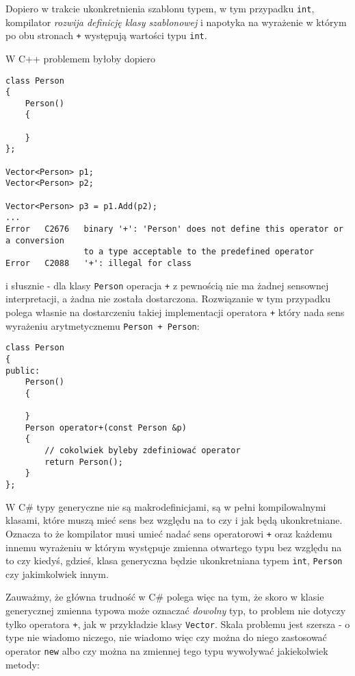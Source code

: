 Dopiero w trakcie ukonkretnienia szablonu typem, w tym przypadku {\tt int}, kompilator {\em rozwija definicję klasy szablonowej}
i napotyka na wyrażenie w którym po obu stronach {\tt +} występują wartości typu {\tt int}.

W C++ problemem byłoby dopiero

\begin{scriptsize}
\begin{verbatim}
class Person
{
    Person()
    {

    }
};

Vector<Person> p1;
Vector<Person> p2;

Vector<Person> p3 = p1.Add(p2);
...
Error	C2676	binary '+': 'Person' does not define this operator or a conversion 
                to a type acceptable to the predefined operator
Error	C2088	'+': illegal for class	
\end{verbatim}
\end{scriptsize}

i słusznie - dla klasy {\tt Person} operacja {\tt +} z pewnością nie ma żadnej sensownej interpretacji, a
żadna nie została dostarczona. Rozwiązanie w tym przypadku polega własnie na dostarczeniu takiej
implementacji operatora {\tt +} który nada sens wyrażeniu arytmetycznemu {\tt Person + Person}:

\begin{scriptsize}
\begin{verbatim}
class Person
{
public:
    Person()
    {

    }
    Person operator+(const Person &p) 
    {
        // cokolwiek byleby zdefiniować operator
        return Person();
    }
};
\end{verbatim}
\end{scriptsize}

W C\# typy generyczne nie są makrodefinicjami, są w pełni kompilowalnymi klasami, które muszą mieć sens 
bez względu na to czy i jak będą ukonkretniane. Oznacza to że kompilator musi umieć nadać sens operatorowi {\tt +}
oraz każdemu innemu wyrażeniu w którym występuje zmienna otwartego typu
bez względu na to czy kiedyś, gdzieś, klasa generyczna będzie ukonkretniana typem {\tt int}, {\tt Person} czy
jakimkolwiek innym.

Zauważmy, że główna trudność w C\# polega więc na tym, że skoro w klasie generycznej zmienna typowa może oznaczać
{\em dowolny} typ, to problem nie dotyczy tylko operatora {\tt +}, jak w przykładzie klasy {\tt Vector}. Skala problemu
jest szersza - o type nie wiadomo niczego, nie wiadomo więc czy można do niego zastosować operator {\tt new} albo czy można
na zmiennej tego typu wywoływać jakiekolwiek metody:

